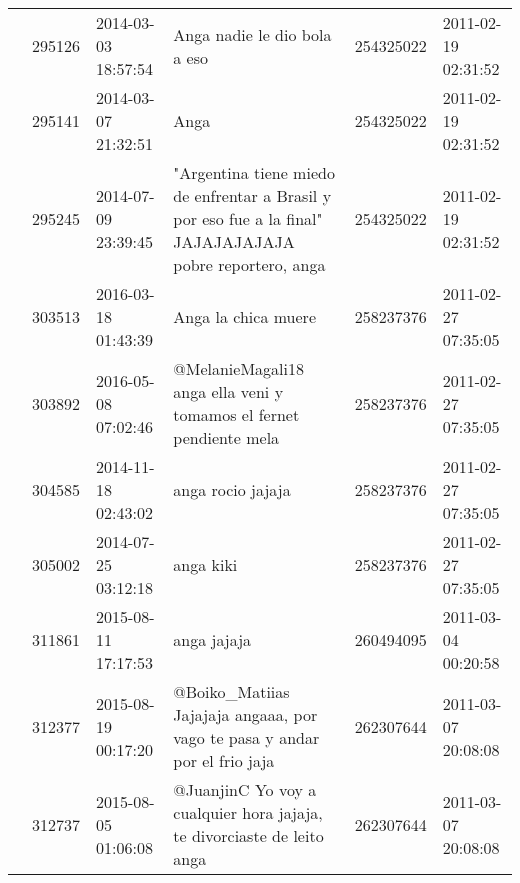 \begin{tabular}{llllrl}
           & 295126  & 2014-03-03 18:57:54 &                                                                                                                 Anga nadie le dio bola a eso &   254325022 & 2011-02-19 02:31:52 \\
           & 295141  & 2014-03-07 21:32:51 &                                                                                                                                         Anga &   254325022 & 2011-02-19 02:31:52 \\
           & 295245  & 2014-07-09 23:39:45 &                                    "Argentina tiene miedo de enfrentar a Brasil y por eso fue a la final" JAJAJAJAJAJA pobre reportero, anga &   254325022 & 2011-02-19 02:31:52 \\
           & 303513  & 2016-03-18 01:43:39 &                                                                                                                          Anga la chica muere &   258237376 & 2011-02-27 07:35:05 \\
           & 303892  & 2016-05-08 07:02:46 &                                                                           @MelanieMagali18 anga ella veni y tomamos el fernet pendiente mela &   258237376 & 2011-02-27 07:35:05 \\
           & 304585  & 2014-11-18 02:43:02 &                                                                                                                            anga rocio jajaja &   258237376 & 2011-02-27 07:35:05 \\
           & 305002  & 2014-07-25 03:12:18 &                                                                                                                                    anga kiki &   258237376 & 2011-02-27 07:35:05 \\
           & 311861  & 2015-08-11 17:17:53 &                                                                                                                                  anga jajaja &   260494095 & 2011-03-04 00:20:58 \\
           & 312377  & 2015-08-19 00:17:20 &                                                                    @Boiko\_Matiias Jajajaja angaaa, por vago te pasa y andar por el frio jaja &   262307644 & 2011-03-07 20:08:08 \\
           & 312737  & 2015-08-05 01:06:08 &                                                                       @JuanjinC Yo voy a cualquier hora jajaja, te divorciaste de leito anga &   262307644 & 2011-03-07 20:08:08 \\

\end{tabular}
